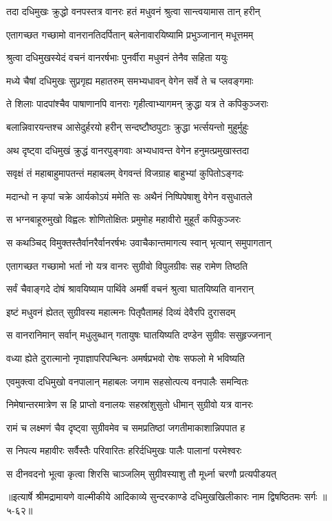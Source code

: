 \twolineshloka
{तदा दधिमुखः क्रुद्धो वनपस्तत्र वानरः}
{हतं मधुवनं श्रुत्वा सान्त्वयामास तान् हरीन्} %

\twolineshloka
{एतागच्छत गच्छामो वानरानतिदर्पितान्}
{बलेनावारयिष्यामि प्रभुञ्जानान् मधूत्तमम्} %

\twolineshloka
{श्रुत्वा दधिमुखस्येदं वचनं वानरर्षभाः}
{पुनर्वीरा मधुवनं तेनैव सहिता ययुः} %

\twolineshloka
{मध्ये चैषां दधिमुखः सुप्रगृह्य महातरुम्}
{समभ्यधावन् वेगेन सर्वे ते च प्लवङ्गमाः} %

\twolineshloka
{ते शिलाः पादपांश्चैव पाषाणानपि वानराः}
{गृहीत्वाभ्यागमन् क्रुद्धा यत्र ते कपिकुञ्जराः} %

\twolineshloka
{बलान्निवारयन्तश्च आसेदुर्हरयो हरीन्}
{सन्दष्टौष्ठपुटाः क्रुद्धा भर्त्सयन्तो मुहुर्मुहुः} %

\twolineshloka
{अथ दृष्ट्वा दधिमुखं क्रुद्धं वानरपुङ्गवाः}
{अभ्यधावन्त वेगेन हनुमत्प्रमुखास्तदा} %

\twolineshloka
{सवृक्षं तं महाबाहुमापतन्तं महाबलम्}
{वेगवन्तं विजग्राह बाहुभ्यां कुपितोऽङ्गदः} %

\twolineshloka
{मदान्धो न कृपां चक्रे आर्यकोऽयं ममेति सः}
{अथैनं निष्पिपेषाशु वेगेन वसुधातले} %

\twolineshloka
{स भग्नबाहूरुमुखो विह्वलः शोणितोक्षितः}
{प्रमुमोह महावीरो मुहूर्तं कपिकुञ्जरः} %

\twolineshloka
{स कथञ्चिद् विमुक्तस्तैर्वानरैर्वानरर्षभः}
{उवाचैकान्तमागत्य स्वान् भृत्यान् समुपागतान्} %

\twolineshloka
{एतागच्छत गच्छामो भर्ता नो यत्र वानरः}
{सुग्रीवो विपुलग्रीवः सह रामेण तिष्ठति} %

\twolineshloka
{सर्वं चैवाङ्गदे दोषं श्रावयिष्याम पार्थिवे}
{अमर्षी वचनं श्रुत्वा घातयिष्यति वानरान्} %

\twolineshloka
{इष्टं मधुवनं ह्येतत् सुग्रीवस्य महात्मनः}
{पितृपैतामहं दिव्यं देवैरपि दुरासदम्} %

\twolineshloka
{स वानरानिमान् सर्वान् मधुलुब्धान् गतायुषः}
{घातयिष्यति दण्डेन सुग्रीवः ससुहृज्जनान्} %

\twolineshloka
{वध्या ह्येते दुरात्मानो नृपाज्ञापरिपन्थिनः}
{अमर्षप्रभवो रोषः सफलो मे भविष्यति} %

\twolineshloka
{एवमुक्त्वा दधिमुखो वनपालान् महाबलः}
{जगाम सहसोत्पत्य वनपालैः समन्वितः} %

\twolineshloka
{निमेषान्तरमात्रेण स हि प्राप्तो वनालयः}
{सहस्रांशुसुतो धीमान् सुग्रीवो यत्र वानरः} %

\twolineshloka
{रामं च लक्ष्मणं चैव दृष्ट्वा सुग्रीवमेव च}
{समप्रतिष्ठां जगतीमाकाशान्निपपात ह} %

\twolineshloka
{स निपत्य महावीरः सर्वैस्तैः परिवारितः}
{हरिर्दधिमुखः पालैः पालानां परमेश्वरः} %

\twolineshloka
{स दीनवदनो भूत्वा कृत्वा शिरसि चाञ्जलिम्}
{सुग्रीवस्याशु तौ मूर्ध्ना चरणौ प्रत्यपीडयत्} %


॥इत्यार्षे श्रीमद्रामायणे वाल्मीकीये आदिकाव्ये सुन्दरकाण्डे दधिमुखखिलीकारः नाम द्विषष्ठितमः सर्गः ॥५-६२॥
